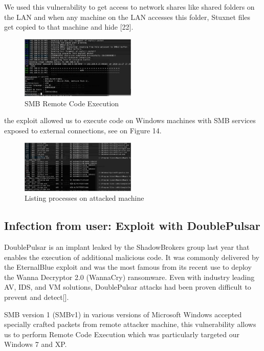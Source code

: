 \documentclass[conference]{IEEEtran}
\begin{document}
We used this vulnerability to get access to network shares like shared folders on the LAN and when any machine on the LAN accesses this folder, Stuxnet files get copied to that machine and hide [22].
\begin{figure}[!htb]
	\includegraphics[width=0.49\textwidth]{images/eternalblue.png}
	\caption{ SMB Remote Code Execution}
	\label{fig:fb}
\end{figure}

the exploit  allowed us to execute code on Windows machines with SMB services exposed to external connections, see on Figure 14.

\begin{figure}[!htb]
	\includegraphics[width=0.49\textwidth]{images/svhostexe.png}
	\caption{ Listing processes on attacked machine	}
	\label{fig:fb}
\end{figure}

\subsection{Infection from user: Exploit with DoublePulsar}

DoublePulsar is an implant leaked by the ShadowBrokers group last year that enables the execution of additional malicious code. It was commonly delivered by the EternalBlue exploit and was the most famous from its recent use to deploy the Wanna Decryptor 2.0 (WannaCry) ransomware. Even with industry leading AV, IDS, and VM solutions, DoublePulsar attacks had been proven difficult to prevent and detect[].

SMB version 1 (SMBv1) in various versions of Microsoft Windows accepted specially crafted packets from remote attacker machine, this vulnerability allows us to perform Remote Code Execution which was particularly targeted our Windows 7 and XP.
\end{document}
